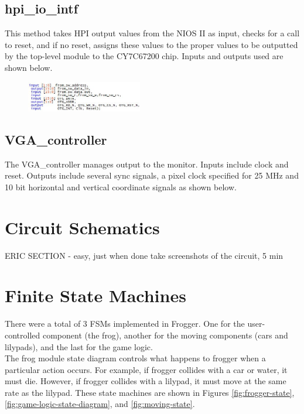 \documentclass[journal, twocolumn, final,11pt,letterpaper]{IEEEtran}
\begin{document}
	\subsection{hpi\_io\_intf}
	This method takes HPI output values from the NIOS II as input, checks for a call to reset, and if no reset, assigns these values to the proper values to be outputted by the top-level module to the CY7C67200 chip.  Inputs and outputs used are shown below. 
	
	\begin{figure}[h]
		\centering
		\includegraphics[width=0.45\textwidth]{hpiio.jpg}
		\label{fig:hpiio}
	\end{figure}
	
	\subsection{VGA\_controller}
	The VGA\_controller manages output to the monitor.  Inputs include clock and reset. Outputs include several sync signals, a pixel clock specified for 25 MHz and 10 bit horizontal and vertical coordinate signals as shown below.
	


	
\section{Circuit Schematics}
	ERIC SECTION - easy, just when done take screenshots of the circuit, 5 min



\section{Finite State Machines}
There were a total of 3 FSMs implemented in Frogger. One for the user-controlled component (the frog), another for the moving components (cars and lilypads), and the last for the game logic.\\ 

The frog module state diagram controls what happens to frogger when a particular action occurs. For example, if frogger collides with a car or water, it must die. However, if frogger collides with a lilypad, it must move at the same rate as the lilypad. These state machines are shown in Figures \ref{fig:frogger-state}, \ref{fig:game-logic-state-diagram}, and \ref{fig:moving-state}.
\end{document}
